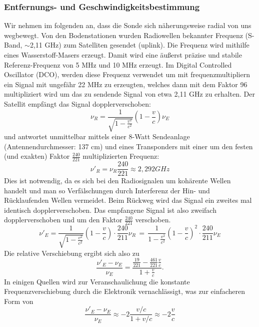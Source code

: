 \subsubsection{Entfernungs- und Geschwindigkeitsbestimmung }
Wir nehmen im folgenden an, dass die Sonde sich näherungsweise radial von uns wegbewegt.
Von den Bodenstationen wurden Radiowellen bekannter Frequenz (S-Band, $\sim$2,11 GHz) zum Satelliten gesendet (uplink).
Die Frequenz wird mithilfe eines Wasserstoff-Masers erzeugt.
Damit wird eine äußerst präzise und stabile Referenz-Frequenz von 5 MHz und 10 MHz erzeugt. Im Digital Controlled Oscillator (DCO), werden diese Frequenz verwendet um mit frequenzmultipliern ein Signal mit ungefähr 22 MHz zu erzeugten, welches dann mit dem Faktor 96 multipliziert wird um das zu sendende Signal von etwa 2,11 GHz zu erhalten.\cite{Anderson2002}
Der Satellit empfängt das Signal dopplerverschoben:
\begin{equation}
 \nu_R = \frac{1}{\sqrt{1-\frac{v^2}{c^2}}}(1-\frac{v}{c})\nu_E
\end{equation}
und antwortet unmittelbar mittels einer 8-Watt Sendeanlage (Antennendurchmesser: 137 cm\cite{Markwardt2002}) und eines Transponders
mit einer um den festen (und exakten) Faktor $ \frac{240}{221} $ multiplizierten Frequenz:
\begin{equation}
\label{equ:Faktor}
\nu'_R = \nu_R\frac{240}{221} \approx 2,292 GHz
\end{equation}
Dies ist notwendig, da es sich bei den Radiosignalen um kohärente Wellen handelt und man so Verfälschungen durch Interferenz der Hin- und Rücklaufenden Wellen vermeidet.\cite{Anderson2002}
Beim Rückweg wird das Signal ein zweites mal identisch dopplerverschoben.
Das empfangene Signal ist also zweifach dopplerverschoben und um den Faktor $\frac{240}{221}$ verschoben.
\begin{equation}
 \nu'_E = \frac{1}{\sqrt{1-\frac{v^2}{c^2}}}(1-\frac{v}{c}) \cdot \frac{240}{211}\nu_R \, = \,
\frac{1}{1-\frac{v^2}{c^2}}(1-\frac{v}{c})^2 \cdot \frac{240}{211} \nu_E
\end{equation}
Die relative Verschiebung ergibt sich also zu
\begin{equation}
 \frac{\nu'_E-\nu_E}{\nu_E} = \frac{\frac{19}{221}- \frac{461}{221}\frac{v}{c}}{1+\frac{v}{c}}.
\end{equation}
In einigen Quellen wird zur Veranschaulichung die konstante Frequenzverschiebung durch die Elektronik
vernachlässigt, was zur einfacheren Form von
\begin{equation}
 \frac{\nu'_E-\nu_E}{\nu_E} \approx -2\frac{v/c}{1+v/c} \approx -2 \frac{v}{c}
\end{equation}

